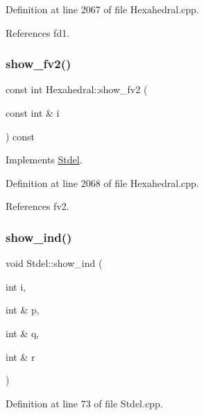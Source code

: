 Definition at line 2067 of file Hexahedral.\+cpp.



References fd1.

\mbox{\label{classHexahedral_a5eadccb0e54a1852c01a1f90a3a2bfd9}} 
\subsubsection{\texorpdfstring{show\+\_\+fv2()}{show\_fv2()}}
{\footnotesize\ttfamily const int Hexahedral\+::show\+\_\+fv2 (\begin{DoxyParamCaption}\item[{const int \&}]{i }\end{DoxyParamCaption}) const\hspace{0.3cm}{\ttfamily [virtual]}}



Implements \hyperlink{classStdel_a67f16a65f02fc8a5aa10274539bd1ad8}{Stdel}.



Definition at line 2068 of file Hexahedral.\+cpp.



References fv2.

\mbox{\label{classStdel_a20afd536025caf1aad1c4e3f41fcb866}} 
\subsubsection{\texorpdfstring{show\+\_\+ind()}{show\_ind()}}
{\footnotesize\ttfamily void Stdel\+::show\+\_\+ind (\begin{DoxyParamCaption}\item[{int}]{i,  }\item[{int \&}]{p,  }\item[{int \&}]{q,  }\item[{int \&}]{r }\end{DoxyParamCaption})\hspace{0.3cm}{\ttfamily [inherited]}}



Definition at line 73 of file Stdel.\+cpp.



